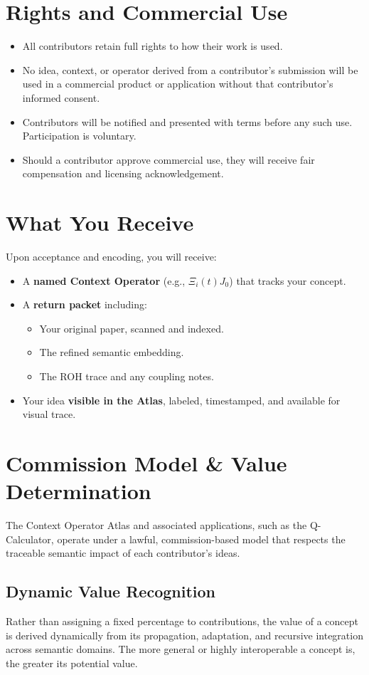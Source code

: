 \documentclass[12pt]{article}
\begin{document}
\section{Rights and Commercial Use}
\begin{itemize}
    \item All contributors retain full rights to how their work is used.
    \item No idea, context, or operator derived from a contributor’s submission will be used in a commercial product or application without that contributor’s informed consent.
    \item Contributors will be notified and presented with terms before any such use. Participation is voluntary.
    \item Should a contributor approve commercial use, they will receive fair compensation and licensing acknowledgement.
\end{itemize}

\section{What You Receive}
Upon acceptance and encoding, you will receive:
\begin{itemize}
    \item A \textbf{named Context Operator} (e.g., $\Xi_i(t)J_0$) that tracks your concept.
    \item A \textbf{return packet} including:
    \begin{itemize}
        \item Your original paper, scanned and indexed.
        \item The refined semantic embedding.
        \item The ROH trace and any coupling notes.
    \end{itemize}
    \item Your idea \textbf{visible in the Atlas}, labeled, timestamped, and available for visual trace.
\end{itemize}
\section{Commission Model \& Value Determination}

The Context Operator Atlas and associated applications, such as the Q-Calculator, operate under a lawful, commission-based model that respects the traceable semantic impact of each contributor’s ideas.

\subsection*{Dynamic Value Recognition}
Rather than assigning a fixed percentage to contributions, the value of a concept is derived dynamically from its propagation, adaptation, and recursive integration across semantic domains. The more general or highly interoperable a concept is, the greater its potential value.
\end{document}
